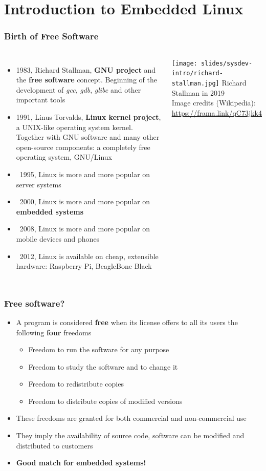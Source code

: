\section{Introduction to Embedded Linux}

\begin{frame}
  \frametitle{Birth of Free Software}
  \begin{columns}
      \begin{itemize}
      \item 1983, Richard Stallman, {\bf GNU project} and the {\bf free
          software} concept.  Beginning of the development of {\em gcc},
        {\em gdb}, {\em glibc} and other important tools
      \item 1991, Linus Torvalds, {\bf Linux kernel project}, a UNIX-like
        operating system kernel. Together with GNU software and many other
        open-source components: a completely free operating system,
        GNU/Linux
      \item ~1995, Linux is more and more popular on server systems
      \item ~2000, Linux is more and more popular on {\bf embedded
          systems}
      \item ~2008, Linux is more and more popular on mobile devices and phones
      \item ~2012, Linux is available on cheap, extensible hardware:
            Raspberry Pi, BeagleBone Black
      \end{itemize}
      \texttt{[image: slides/sysdev-intro/richard-stallman.jpg]}
      \scriptsize
      Richard Stallman in 2019\\
      \tiny
      Image credits (Wikipedia):\\
      \url{https://frama.link/qC73jkk4}
    \end{columns}

\end{frame}

\begin{frame}
  \frametitle{Free software?}
  \begin{itemize}
  \item A program is considered {\bf free} when its license offers to
    all its users the following {\bf four} freedoms
    \begin{itemize}
    \item Freedom to run the software for any purpose
    \item Freedom to study the software and to change it
    \item Freedom to redistribute copies
    \item Freedom to distribute copies of modified versions
    \end{itemize}
  \item These freedoms are granted for both commercial and
    non-commercial use
  \item They imply the availability of source code, software can be
    modified and distributed to customers
  \item {\bf Good match for embedded systems!}
  \end{itemize}
\end{frame}

